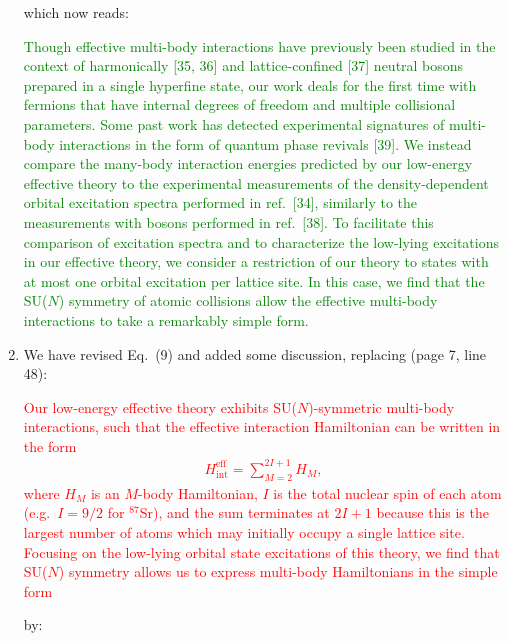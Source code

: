 \documentclass[preprint]{revtex4-1}
\renewcommand{\t}{\text} %
\newcommand{\1}{\mathds{1}}
\newcommand{\red}[1]{\textcolor{red}{#1}}
\newcommand{\green}[1]{\textcolor{green}{#1}}
\newcounter{point}
\begin{document}
\begin{enumerate}[label=(R1.\arabic{point}.\arabic*)]
  which now reads:

  \green{Though effective multi-body interactions have previously been
    studied in the context of harmonically [35, 36] and
    lattice-confined [37] neutral bosons prepared in a single
    hyperfine state, our work deals for the first time with fermions
    that have internal degrees of freedom and multiple collisional
    parameters.  Some past work has detected experimental signatures
    of multi-body interactions in the form of quantum phase revivals
    [39].  We instead compare the many-body interaction energies
    predicted by our low-energy effective theory to the experimental
    measurements of the density-dependent orbital excitation spectra
    performed in ref.~[34], similarly to the measurements with bosons
    performed in ref.~[38].  To facilitate this comparison of
    excitation spectra and to characterize the low-lying excitations
    in our effective theory, we consider a restriction of our theory
    to states with at most one orbital excitation per lattice site.
    In this case, we find that the SU($N$) symmetry of atomic
    collisions allow the effective multi-body interactions to take a
    remarkably simple form.}


\item We have revised Eq.~(9) and added some discussion, replacing
  (page 7, line 48):

  \red{Our low-energy effective theory exhibits SU($N$)-symmetric
    multi-body interactions, such that the effective interaction
    Hamiltonian can be written in the form
    \begin{align*}
      H_{\t{int}}^{\t{eff}} = \sum_{M=2}^{2I+1} H_M, \tag{9}
    \end{align*}
    where $H_M$ is an $M$-body Hamiltonian, $I$ is the total nuclear
    spin of each atom (e.g.~$I=9/2$ for ${}^{87}$Sr), and the sum
    terminates at $2I+1$ because this is the largest number of atoms
    which may initially occupy a single lattice site.  Focusing on the
    low-lying orbital state excitations of this theory, we find that
    SU($N$) symmetry allows us to express multi-body Hamiltonians in
    the simple form}

  by:


\end{enumerate}
\end{document}

